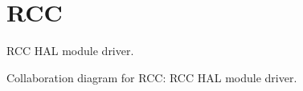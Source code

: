 \hypertarget{group__RCC}{}\section{R\+CC}
\label{group__RCC}


R\+CC H\+AL module driver.  


Collaboration diagram for R\+CC\+:
R\+CC H\+AL module driver. 

